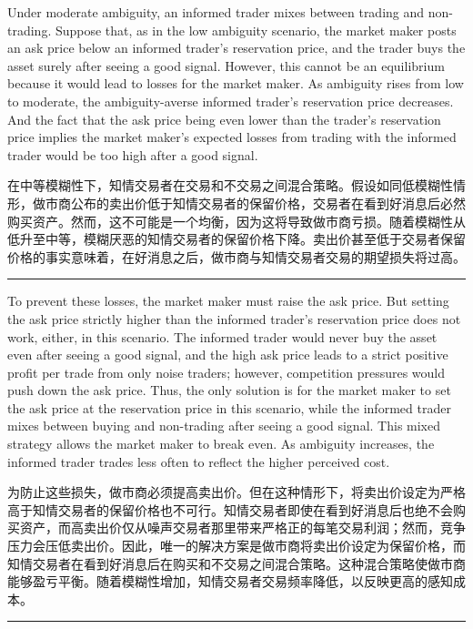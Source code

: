 \documentclass[12pt,a4paper]{article}
\newenvironment{original}{%
  \par\vspace{4pt}\noindent%
  \color{black}%
  \ignorespaces
}{%
  \par\vspace{2pt}%
}
\newenvironment{translation}{%
  \par\vspace{2pt}\noindent%
  \color{transblue}%
  \ignorespaces
}{%
  \par\vspace{4pt}\hrule\vspace{6pt}%
}
\begin{document}
\begin{original}
Under moderate ambiguity, an informed trader mixes between trading and non-trading. Suppose that, as in the low ambiguity scenario, the market maker posts an ask price below an informed trader's reservation price, and the trader buys the asset surely after seeing a good signal. However, this cannot be an equilibrium because it would lead to losses for the market maker. As ambiguity rises from low to moderate, the ambiguity-averse informed trader's reservation price decreases. And the fact that the ask price being even lower than the trader's reservation price implies the market maker's expected losses from trading with the informed trader would be too high after a good signal.
\end{original}
\begin{translation}
在中等模糊性下，知情交易者在交易和不交易之间混合策略。假设如同低模糊性情形，做市商公布的卖出价低于知情交易者的保留价格，交易者在看到好消息后必然购买资产。然而，这不可能是一个均衡，因为这将导致做市商亏损。随着模糊性从低升至中等，模糊厌恶的知情交易者的保留价格下降。卖出价甚至低于交易者保留价格的事实意味着，在好消息之后，做市商与知情交易者交易的期望损失将过高。
\end{translation}

\begin{original}
To prevent these losses, the market maker must raise the ask price. But setting the ask price strictly higher than the informed trader's reservation price does not work, either, in this scenario. The informed trader would never buy the asset even after seeing a good signal, and the high ask price leads to a strict positive profit per trade from only noise traders; however, competition pressures would push down the ask price. Thus, the only solution is for the market maker to set the ask price at the reservation price in this scenario, while the informed trader mixes between buying and non-trading after seeing a good signal. This mixed strategy allows the market maker to break even. As ambiguity increases, the informed trader trades less often to reflect the higher perceived cost.
\end{original}
\begin{translation}
为防止这些损失，做市商必须提高卖出价。但在这种情形下，将卖出价设定为严格高于知情交易者的保留价格也不可行。知情交易者即使在看到好消息后也绝不会购买资产，而高卖出价仅从噪声交易者那里带来严格正的每笔交易利润；然而，竞争压力会压低卖出价。因此，唯一的解决方案是做市商将卖出价设定为保留价格，而知情交易者在看到好消息后在购买和不交易之间混合策略。这种混合策略使做市商能够盈亏平衡。随着模糊性增加，知情交易者交易频率降低，以反映更高的感知成本。
\end{translation}
\end{document}
